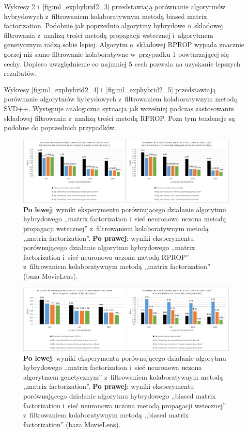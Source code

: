 \documentclass[twoside]{iisthesis}
\begin{document}
		Wykresy \ref{fig:ml_exphybrid2_2} i~\ref{fig:ml_exphybrid2_3} przedstawiają porównanie algorytmów hybrydowych z~filtrowaniem kolaboratywnym metodą biased matrix factorization. Podobnie jak poprzednio algorytmy hybrydowe o~składowej filtrowania z~analizą treści metodą propagacji wstecznej i~algorytmem genetycznym radzą sobie lepiej. Algorytm o~składowej RPROP wypada znacznie gorzej niż samo filtrowanie kolaboratywne w~przypadku 1 powtarzającej się cechy. Dopiero uwzględnienie co najmniej 5 cech pozwala na uzyskanie lepszych rezultatów.
		
		Wykresy \ref{fig:ml_exphybrid2_4} i~\ref{fig:ml_exphybrid2_5} przedstawiają porównanie algorytmów hybrydowych z~filtrowaniem kolaboratywnym metodą SVD++. Występuje analogiczna sytuacja jak wcześniej podczas zastosowaniu składowej filtrowania z~analizą treści metodą RPROP. Poza tym tendencje są podobne do poprzednich przypadków.
		
		\begin{figure}
			\centering
			\includegraphics[width=1\textwidth]{ml_exphybrid2_1}			
			\caption{\textbf{Po lewej}: wyniki eksperymentu porównującego działanie algorytmu hybrydowego ,,matrix factorization i~sieć neuronowa uczona metodą propagacji wstecznej'' z~filtrowaniem kolaboratywnym metodą ,,matrix factorization''. \textbf{Po prawej}: wyniki eksperymentu porównującego działanie algorytmu hybrydowego ,,matrix factorization i~sieć neuronowa uczona metodą RPROP'' z~filtrowaniem kolaboratywnym metodą ,,matrix factorization'' (baza MovieLens).}
			\label{fig:ml_exphybrid2_1}
		\end{figure}
		
		\begin{figure}
			\centering
			\includegraphics[width=1\textwidth]{ml_exphybrid2_2}			
			\caption{\textbf{Po lewej}: wyniki eksperymentu porównującego działanie algorytmu hybrydowego ,,matrix factorization i~sieć neuronowa uczona algorytmem genetycznym'' z~filtrowaniem kolaboratywnym metodą ,,matrix factorization''. \textbf{Po prawej}: wyniki eksperymentu porównującego działanie algorytmu hybrydowego ,,biased matrix factorization i~sieć neuronowa uczona metodą propagacji wstecznej'' z~filtrowaniem kolaboratywnym metodą ,,biased matrix factorization'' (baza MovieLens).}
			\label{fig:ml_exphybrid2_2}
		\end{figure}
		
\end{document}
